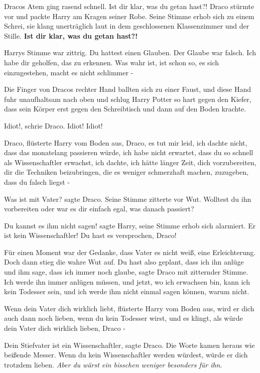 Dracos Atem ging rasend schnell. \glqq Ist dir klar, was du getan hast?!\grqq{}
Draco stürmte vor und packte Harry am Kragen seiner Robe. Seine Stimme erhob
sich zu einem Schrei, sie klang unerträglich laut in dem geschlossenen
Klassenzimmer und der Stille. \textbf{ \glqq Ist dir klar, was du getan
hast?!\grqq{} }

Harrys Stimme war zittrig. \glqq Du hattest einen Glauben. Der Glaube war
falsch. Ich habe dir geholfen, das zu erkennen. Was wahr ist, ist schon so, es
sich einzugestehen, macht es nicht schlimmer -\grqq{}

Die Finger von Dracos rechter Hand ballten sich zu einer Faust, und diese Hand
fuhr unaufhaltsam nach oben und schlug Harry Potter so hart gegen den Kiefer,
dass sein Körper erst gegen den Schreibtisch und dann auf den Boden krachte.

\glqq Idiot!\grqq{}, schrie Draco. \glqq Idiot! Idiot!\grqq{}

\glqq Draco\grqq{}, flüsterte Harry vom Boden aus, \glqq Draco, es tut mir leid,
ich dachte nicht, dass das monatelang passieren würde, ich habe nicht erwartet,
dass du so schnell als Wissenschaftler erwachst, ich dachte, ich hätte länger
Zeit, dich vorzubereiten, dir die Techniken beizubringen, die es weniger
schmerzhaft machen, zuzugeben, dass du falsch liegst -\grqq{}

\glqq Was ist mit Vater?\grqq{} sagte Draco. Seine Stimme zitterte vor Wut.
\glqq Wolltest du ihn vorbereiten oder war es dir einfach egal, was danach
passiert?\grqq{}

\glqq Du kannst es ihm nicht sagen!\grqq{} sagte Harry, seine Stimme erhob sich
alarmiert. \glqq Er ist kein Wissenschaftler! Du hast es versprochen,
Draco!\grqq{}

Für einen Moment war der Gedanke, dass Vater es nicht weiß, eine Erleichterung.
Doch dann stieg die wahre Wut auf. \glqq Du hast also geplant, dass ich ihn
anlüge und ihm sage, dass ich immer noch glaube\grqq{}, sagte Draco mit
zitternder Stimme. \glqq Ich werde ihn immer anlügen müssen, und jetzt, wo ich
erwachsen bin, kann ich kein Todesser sein, und ich werde ihm nicht einmal sagen
können, warum nicht.\grqq{}

\glqq Wenn dein Vater dich wirklich liebt\grqq{}, flüsterte Harry vom Boden aus,
\glqq wird er dich auch dann noch lieben, wenn du kein Todesser wirst, und es
klingt, als würde dein Vater dich wirklich lieben, Draco -\grqq{}

\glqq Dein Stiefvater ist ein Wissenschaftler\grqq{}, sagte Draco. Die Worte
kamen heraus wie beißende Messer. \glqq Wenn du kein Wissenschaftler werden
würdest, würde er dich trotzdem lieben. \emph{Aber du wärst ein bisschen weniger
besonders für ihn}.\grqq{}

